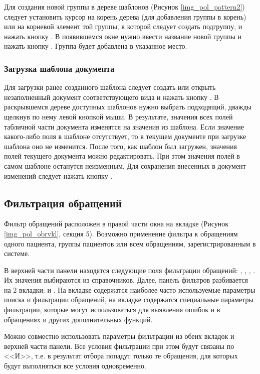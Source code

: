 Для создания новой группы в дереве шаблонов (Рисунок \ref{img_pol_pattern2}) следует установить курсор на корень дерева (для добавления группы в корень) или на корневой элемент той группы, в которой следует создать подгруппу, и нажать кнопку . В появившемся окне нужно ввести название новой группы и нажать кнопку . Группа будет добавлена в указанное место.

\subsubsection{Загрузка шаблона документа}

Для загрузки ранее созданного шаблона следует создать или открыть незаполненный документ соответствующего вида и нажать кнопку . В раскрывшемся дереве доступных шаблонов нужно выбрать подходящий, дважды щелкнув по нему левой кнопкой мыши. В результате, значения всех полей табличной части документа изменятся на значения из шаблона. Если значение какого-либо поля в шаблоне отсутствует, то в текущем документе при загрузке шаблона оно не изменится. После того, как шаблон был загружен, значения полей текущего документа можно редактировать. При этом значения полей в самом шаблоне останутся неизменным. Для сохранения внесенных в документ изменений следует нажать кнопку .

\subsection{Фильтрация обращений} \label{pol_obr_filtr}

Фильтр обращений расположен в правой части окна на вкладке  (Рисунок \ref{img_pol_obrvkl}, секция 5). Возможно применение фильтра к обращениям одного пациента, группы пациентов или всем обращениям, зарегистрированным в системе.

В верхней части панели  находятся следующие поля фильтрации обращений: , , , . Их значения выбираются из справочников. Далее, панель фильтров разбивается на 2 вкладки:  и . На вкладке  содержатся наиболее часто используемые параметры поиска и фильтрации обращений, на вкладке  содержатся специальные параметры фильтрации, которые могут использоваться для выявления ошибок и в обращениях и других дополнительных функций.

Можно совместно использовать параметры фильтрации из обеих вкладок и верхней части панели. Все условия фильтрации при этом будут связаны по <<И>>, т.е. в результат отбора попадут только те обращения, для которых будут выполняться все условия одновременно.

